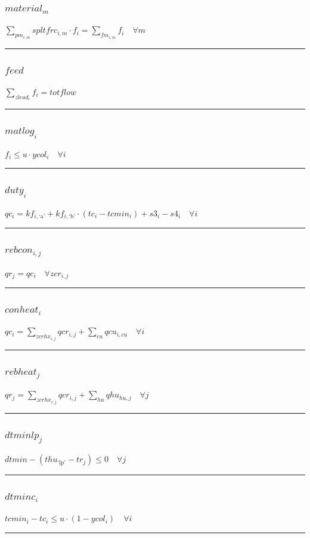 \documentclass[11pt]{article}
\begin{document}
\subsubsection*{$material_{m}$}
$
\sum_{pm_{i,m}} spltfrc_{i,m} \cdot f_{i} = \sum_{fm_{i,m}} f_{i}\quad \forall m
$
\vspace{5pt}
\hrule
\subsubsection*{$feed$}
$
\sum_{zlead_{i}} f_{i} = totflow
$
\vspace{5pt}
\hrule
\subsubsection*{$matlog_{i}$}
$
f_{i} \leq u \cdot ycol_{i}\quad \forall i
$
\vspace{5pt}
\hrule
\subsubsection*{$duty_{i}$}
$
qc_{i} = kf_{i,\text{`a'}} + kf_{i,\text{`b'}} \cdot (tc_{i} - tcmin_{i}) + s3_{i} - s4_{i}\quad \forall i
$
\vspace{5pt}
\hrule
\subsubsection*{$rebcon_{i,j}$}
$
qr_{j} = qc_{i}\quad \forall zcr_{i,j}
$
\vspace{5pt}
\hrule
\subsubsection*{$conheat_{i}$}
$
qc_{i} = \sum_{zcrhx_{i,j}} qcr_{i,j} + \sum_{cu} qcu_{i,cu}\quad \forall i
$
\vspace{5pt}
\hrule
\subsubsection*{$rebheat_{j}$}
$
qr_{j} = \sum_{zcrhx_{i,j}} qcr_{i,j} + \sum_{hu} qhu_{hu,j}\quad \forall j
$
\vspace{5pt}
\hrule
\subsubsection*{$dtminlp_{j}$}
$
dtmin - (thu_{\text{`lp'}} - tr_{j}) \leq 0\quad \forall j
$
\vspace{5pt}
\hrule
\subsubsection*{$dtminc_{i}$}
$
tcmin_{i} - tc_{i} \leq u \cdot (1 - ycol_{i})\quad \forall i
$
\vspace{5pt}
\hrule
\end{document}
